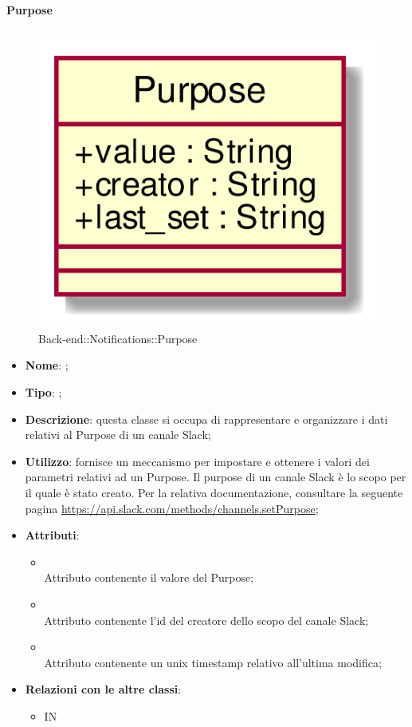\hypertarget{Purpose_label}{\paragraph{Purpose}}
\begin{figure}[h]
	\centering
	\includegraphics[width=\textwidth,height=\textheight,keepaspectratio]{images/ClassPurpose.png}
	\caption{Back-end::Notifications::Purpose}
\end{figure}
\begin{itemize}
	\item \textbf{Nome}: ;
	\item \textbf{Tipo}: ;
	\item \textbf{Descrizione}: questa classe si occupa di rappresentare e organizzare i dati relativi al Purpose di un canale Slack;
	\item \textbf{Utilizzo}: fornisce un meccanismo per impostare e ottenere i valori dei parametri relativi ad un Purpose.
Il purpose di un canale Slack è lo scopo per il quale è stato creato.
Per la relativa documentazione, consultare la seguente pagina \url{https://api.slack.com/methods/channels.setPurpose};
	\item \textbf{Attributi}:
	\begin{itemize}
		\item[]  \\
		Attributo contenente il valore del Purpose;
		\item[]  \\
		Attributo contenente l'id del creatore dello scopo del canale Slack;
		\item[]  \\
		Attributo contenente un unix timestamp relativo all'ultima modifica;
	\end{itemize}
	\item \textbf{Relazioni con le altre classi}:
	\begin{itemize}
		\item IN \hyperlink{NotificationChannel_label}{}
	\end{itemize}
\end{itemize}

